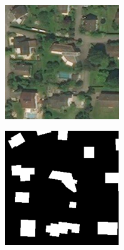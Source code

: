 \begin{figure}[H] 
\centering
  \begin{subfigure}[b]{0.4\linewidth}
    \centering
    \includegraphics[width=0.9\linewidth]{chapters/theoretical_and_experimental_results/images/18_138079_170377.png}
            \caption{}
            \label{fig:results:airtiler_output_orthophoto}
    \vspace{4ex}
  \end{subfigure}%
  \begin{subfigure}[b]{0.4\linewidth}
    \centering
            \includegraphics[width=0.9\linewidth]{chapters/theoretical_and_experimental_results/images/18_138079_170377_building.png}

\end{subfigure}
\end{figure}
